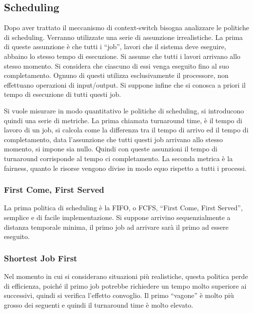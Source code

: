 \documentclass{article}
\numberwithin{equation}{subsection}
\begin{document}
\subsection{Scheduling}

Dopo aver trattato il meccanismo di context-switch bisogna analizzare le politiche di scheduling. 
Verranno utilizzate una serie di assunzione irrealistiche. 
La prima di queste assunzione è che tutti i ``job'', lavori che il sistema deve eseguire, abbaino lo stesso tempo di esecuzione. Si assume che tutti i lavori arrivano 
allo stesso momento. Si considera che ciascuno di essi venga eseguito fino al suo completamento. Ognuno di questi utilizza esclusivamente il processore, non effettuano 
operazioni di input/output. Si suppone infine che si conosca a priori il tempo di esecuzione di tutti questi job. 

Si vuole misurare in modo quantitativo le politiche di scheduling, si introducono quindi una serie di metriche. La prima chiamata turnaround time, è il tempo di 
lavoro di un job, si calcola come la differenza tra il tempo di arrivo ed il tempo di completamento, data l'assunzione che tutti questi job arrivano allo stesso momento, 
si impone sia nullo. Quindi con queste assunzioni il tempo di turnaround corrisponde al tempo ci completamento. 
La seconda metrica è la fairness, quanto le risorse vengono divise in modo equo rispetto a tutti i processi. 

\subsubsection{First Come, First Served}

La prima politica di scheduling è la FIFO, o FCFS, ``First Come, First Served'', semplice e di facile implementazione. Si suppone arrivino sequenzialmente a distanza 
temporale minima, il primo job ad arrivare sarà il primo ad essere eseguito. 


\subsubsection{Shortest Job First}

Nel momento in cui si considerano situazioni più realistiche, questa politica perde di efficienza, poiché il primo job potrebbe richiedere un tempo molto superiore ai 
successivi, quindi si verifica l'effetto convoglio. Il primo ``vagone'' è molto più grosso dei seguenti e quindi il turnaround time è molto elevato. 
\end{document}
